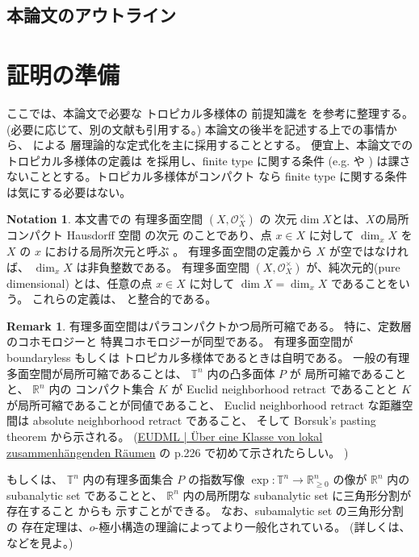 \documentclass[a4paper,dvipdfmx,reqno,12pt]{amsart}
\theoremstyle{definition}
\newtheorem{notation}[theorem]{Notation}
\newtheorem{remark}[theorem]{Remark}
\newcommand{\opn}[1]{\operatorname{#1}}
\numberwithin{equation}{section}
\begin{document}
\subsection{本論文のアウトライン}



\section{証明の準備}

ここでは、本論文で必要な
トロピカル多様体の
前提知識を
\cite{shaw2011tropical,MR3330789,mikhalkin2018tropical,MR4637248,demedrano2023chern}
を参考に整理する。
(必要に応じて、別の文献も引用する。)
本論文の後半を記述する上での事情から、
\cite{MR4637248}による
層理論的な定式化を主に採用することとする。
便宜上、本論文でのトロピカル多様体の定義は
\cite[Definition 6.1]{gross2019sheaftheoretic}
を採用し、finite type に関する条件
(e.g. \cite[Definition 7.1.14]{mikhalkin2018tropical} や
\cite[Definition 2.3 (4)]{demedrano2023chern})
は課さないこととする。トロピカル多様体がコンパクト
なら finite type に関する条件は気にする必要はない。

\begin{notation}
本文書での
有理多面空間 $(X,\mathcal{O}_X^{\times})$ 
\cite[Definition 2.2]{MR4246795} の
次元$\dim X$とは、$X$の局所コンパクト Hausdorff 空間
の次元\cite[Chapter III. Definition 9.4]{MR842190}
のことであり、点 $x\in X$ に対して
$\dim_x X$ を $X$ の $x$ における局所次元と呼ぶ
\cite[Chapter III. Definition 9.10]{MR842190}。
有理多面空間の定義から $X$ が空ではなければ、
$\dim_x X$ は非負整数である。
有理多面空間
$(X,\mathcal{O}_X^{\times})$
が、純次元的(pure dimensional)
とは、任意の点 $x\in X$ に対して
$\dim X=\dim_x X$ であることをいう。
これらの定義は、
\cite[Definition 7.1.1]{mikhalkin2018tropical}
と整合的である。
\end{notation}

\begin{remark}
有理多面空間はパラコンパクトかつ局所可縮である。
特に、定数層のコホモロジーと
特異コホモロジーが同型である。
有理多面空間が
boundaryless もしくは
トロピカル多様体であるときは自明である。
一般の有理多面空間が局所可縮であることは、
$\mathbb{T}^{n}$ 内の凸多面体 $P$ が
局所可縮であることと、
$\mathbb{R}^{n}$ 内の コンパクト集合 $K$ が Euclid 
neighborhood retract であることと
$K$が局所可縮であることが同値であること、
Euclid neighborhood retract な距離空間は
absolute neighborhood retract であること、
そして Borsuk's pasting theorem から示される。
(\href{https://eudml.org/doc/212574}{EUDML | Über eine Klasse von lokal zusammenhängenden Räumen}
の p.226 で初めて示されたらしい。
)

もしくは、
$\mathbb{T}^{n}$ 内の有理多面集合 $P$ の指数写像
$\opn{exp}\colon \mathbb{T}^{n}\to 
\mathbb{R}^{n}_{\geq 0}$ の像が $\mathbb{R}^{n}$
内の subanalytic set であることと、
$\mathbb{R}^{n}$ 内の局所閉な
subanalytic set に三角形分割が存在すること
\cite{MR760983} からも
示すことができる。
なお、subamalytic set の三角形分割の
存在定理は、$o$-極小構造の理論によってより一般化されている。
(詳しくは、\cite[Theorem II]{MR1463945} などを見よ。)
\end{remark}
\end{document}
